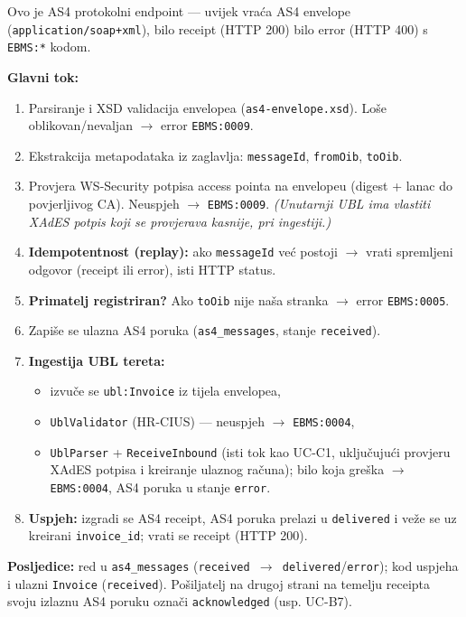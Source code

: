 \documentclass[11pt,a4paper]{article}
\begin{document}
Ovo je AS4 protokolni endpoint — uvijek vraća AS4 envelope (\texttt{application/soap+xml}),
bilo receipt (HTTP 200) bilo error (HTTP 400) s \texttt{EBMS:*} kodom.

\textbf{Glavni tok:}
\begin{enumerate}[nosep]
  \item Parsiranje i XSD validacija envelopea (\texttt{as4-envelope.xsd}). Loše oblikovan/nevaljan
        $\rightarrow$ error \texttt{EBMS:0009}.
  \item Ekstrakcija metapodataka iz zaglavlja: \texttt{messageId}, \texttt{fromOib}, \texttt{toOib}.
  \item Provjera WS-Security potpisa access pointa na envelopeu (digest + lanac do
        povjerljivog CA). Neuspjeh $\rightarrow$ \texttt{EBMS:0009}. \textit{(Unutarnji UBL ima vlastiti XAdES potpis koji
        se provjerava kasnije, pri ingestiji.)}
  \item \textbf{Idempotentnost (replay):} ako \texttt{messageId} već postoji $\rightarrow$ vrati spremljeni odgovor
        (receipt ili error), isti HTTP status.
  \item \textbf{Primatelj registriran?} Ako \texttt{toOib} nije naša stranka $\rightarrow$ error \texttt{EBMS:0005}.
  \item Zapiše se ulazna AS4 poruka (\texttt{as4\_messages}, stanje \texttt{received}).
  \item \textbf{Ingestija UBL tereta:}
    \begin{itemize}[nosep]
      \item izvuče se \texttt{ubl:Invoice} iz tijela envelopea,
      \item \texttt{UblValidator} (HR-CIUS) — neuspjeh $\rightarrow$ \texttt{EBMS:0004},
      \item \texttt{UblParser} + \texttt{ReceiveInbound} (isti tok kao UC-C1, uključujući provjeru XAdES potpisa
            i kreiranje ulaznog računa); bilo koja greška $\rightarrow$ \texttt{EBMS:0004}, AS4 poruka u stanje \texttt{error}.
    \end{itemize}
  \item \textbf{Uspjeh:} izgradi se AS4 receipt, AS4 poruka prelazi u \texttt{delivered} i veže se uz
        kreirani \texttt{invoice\_id}; vrati se receipt (HTTP 200).
\end{enumerate}

\textbf{Posljedice:} red u \texttt{as4\_messages} (\texttt{received $\rightarrow$ delivered}/\texttt{error}); kod uspjeha i ulazni
\texttt{Invoice} (\texttt{received}). Pošiljatelj na drugoj strani na temelju receipta svoju izlaznu AS4
poruku označi \texttt{acknowledged} (usp. UC-B7).
\end{document}
